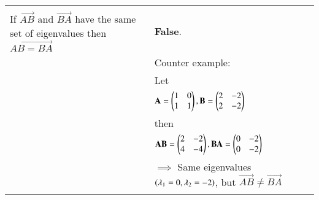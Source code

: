 \documentclass[journal,12pt,twocolumn]{IEEEtran}
\newcommand\myemptypage{
	\null
	\thispagestyle{empty}
	\addtocounter{page}{-1}
	\newpage
}
\begin{document}
\begin{table}[h]
\begin{tabular}{|m{3cm}|m{14cm}|}
		& \\
		\hline
		&\\
		If $\vec{AB}$ and $\vec{BA}$ have the same set of eigenvalues then $\vec{AB=BA}$
		& \textbf{False}. \\
		&Counter example:\\
		& Let\\
		& \qquad\qquad\qquad$\mathbf{A} = \begin{pmatrix}1 & 0 \\ 1 & 1\end{pmatrix}, \mathbf{B} = \begin{pmatrix}2 & -2 \\ 2 & -2\end{pmatrix}$\\
	    &then\\
	    & \qquad\qquad\qquad$\mathbf{AB} = \begin{pmatrix}2 & -2 \\ 4 & -4\end{pmatrix}, \mathbf{BA} = \begin{pmatrix}0 & -2 \\ 0 & -2\end{pmatrix}$\\
        & $\implies$ Same eigenvalues $\left(\lambda_1 = 0, \lambda_2 = -2\right)$, but $\vec{AB} \ne \vec{BA}$
		\\
		&\\
		\hline
			\end{tabular}
	\end{table}
\pagebreak
\myemptypage
\end{document}
